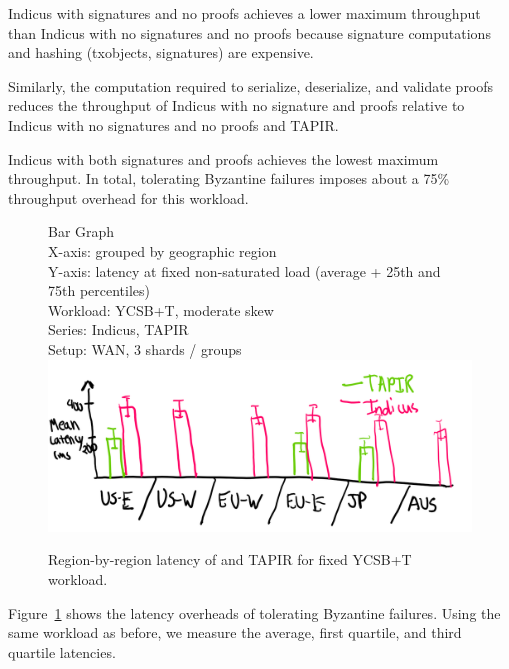 
Indicus with signatures and no proofs achieves a lower maximum throughput than
Indicus with no signatures and no proofs because signature computations and hashing (txobjects, signatures) are
expensive.

Similarly, the computation required to serialize, deserialize, and validate
proofs reduces the throughput of Indicus with no signature and proofs relative
to Indicus with no signatures and no proofs and TAPIR.

Indicus with both signatures and proofs achieves the lowest maximum throughput.
In total, tolerating Byzantine failures imposes about a 75\% throughput overhead
for this workload.


\begin{figure}
  Bar Graph\\
  X-axis: grouped by geographic region\\
  Y-axis: latency at fixed non-saturated load (average + 25th and 75th percentiles)\\
  Workload: YCSB+T, moderate skew\\
  Series: Indicus, TAPIR\\
  Setup: WAN, 3 shards / groups\\
  \includegraphics[width=\columnwidth]{figures/eval/bft-overhead-lat.png}
  \caption{Region-by-region latency of \sys{} and TAPIR for fixed YCSB+T workload.}
  \label{fig:bft-overhead-lat}
\end{figure}

Figure~\ref{fig:bft-overhead-lat} shows the latency overheads of tolerating
Byzantine failures. Using the same workload as before, we measure the average,
first quartile, and third quartile latencies. 

